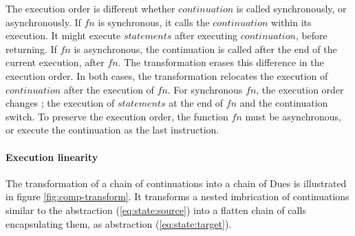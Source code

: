 \begin{figure}[h!]
\end{figure}

The execution order is different whether $continuation$ is called synchronously, or asynchronously.
If $fn$ is synchronous, it calls the $continuation$ within its execution.
It might execute $statements$ after executing $continuation$, before returning.
If $fn$ is asynchronous, the continuation is called after the end of the current execution, after $fn$.
The transformation erases this difference in the execution order.
In both cases, the transformation relocates the execution of $continuation$ after the execution of $fn$.
For synchronous $fn$, the execution order changes ; the execution of $statements$ at the end of $fn$ and the continuation switch.
To preserve the execution order, the function $fn$ must be asynchronous, or execute the continuation as the last instruction.


\paragraph{Execution linearity}

The transformation of a chain of continuations into a chain of Dues is illustrated in figure \ref{fig:comp-transform}.
It transforms a nested imbrication of continuations similar to the abstraction (\ref{eq:state:source}) into a flatten chain of calls encapsulating them, as abstraction (\ref{eq:state:target}).

